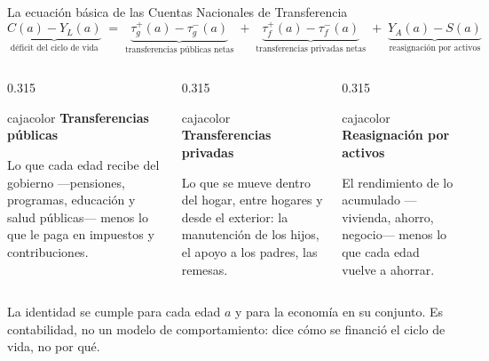 \documentclass[aspectratio=169,10pt]{beamer}
\newcommand{\caja}[2]{%
  \begin{beamercolorbox}[wd=\linewidth,sep=5pt]{cajacolor}
    {\color{marino}\bfseries #1}\par\vspace{0.25em}\footnotesize #2
  \end{beamercolorbox}}
\begin{document}
\begin{frame}{La ecuación básica de las Cuentas Nacionales de Transferencia}
  \vspace{-0.3em}
  \[
  \underbrace{C(a) - Y_L(a)}_{\text{déficit del ciclo de vida}}
  \;=\;
  \underbrace{\tau^{+}_{g}(a) - \tau^{-}_{g}(a)}_{\text{transferencias públicas netas}}
  \;+\;
  \underbrace{\tau^{+}_{f}(a) - \tau^{-}_{f}(a)}_{\text{transferencias privadas netas}}
  \;+\;
  \underbrace{Y_A(a) - S(a)}_{\text{reasignación por activos}}
  \]
  \vspace{0.1em}
  \begin{columns}[T,onlytextwidth]
    \begin{column}{0.315\textwidth}
      \caja{Transferencias públicas}{Lo que cada edad recibe del gobierno ---pensiones, programas, educación y salud públicas--- menos lo que le paga en impuestos y contribuciones.}
    \end{column}
    \begin{column}{0.315\textwidth}
      \caja{Transferencias privadas}{Lo que se mueve dentro del hogar, entre hogares y desde el exterior: la manutención de los hijos, el apoyo a los padres, las remesas.}
    \end{column}
    \begin{column}{0.315\textwidth}
      \caja{Reasignación por activos}{El rendimiento de lo acumulado ---vivienda, ahorro, negocio--- menos lo que cada edad vuelve a ahorrar.}
    \end{column}
  \end{columns}
  \vspace{0.6em}
  {\small La identidad se cumple para cada edad $a$ y para la economía en su conjunto. Es contabilidad, no un modelo de comportamiento: dice cómo se financió el ciclo de vida, no por qué.\par}
\end{frame}
\end{document}
